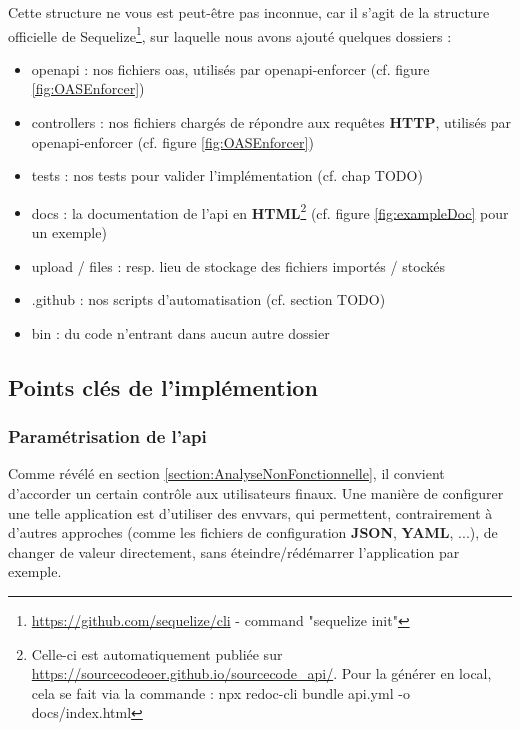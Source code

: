 Cette structure ne vous est peut-être pas inconnue, car il s'agit de la structure officielle de Sequelize\footnote{
    \url{https://github.com/sequelize/cli} - command "sequelize init"
}, sur laquelle nous avons ajouté quelques dossiers :

\begin{itemize}
    \item openapi : nos fichiers \Gls{oas}, utilisés par openapi-enforcer (cf. figure \ref{fig:OASEnforcer})
    \item controllers : nos fichiers chargés de répondre aux requêtes \textbf{HTTP}, utilisés par openapi-enforcer (cf. figure \ref{fig:OASEnforcer})
    \item tests : nos tests pour valider l'implémentation (cf. chap TODO)
    \item docs : la documentation de l'\Gls{api} en \textbf{HTML}\footnote{
        Celle-ci est automatiquement publiée sur 
        \href{https://sourcecodeoer.github.io/sourcecode\_api/}{https://sourcecodeoer.github.io/sourcecode\_api/}.
        Pour la générer en local, cela se fait via la commande : 
        npx redoc-cli bundle api.yml -o docs/index.html 
    } (cf. figure \ref{fig:exampleDoc} pour un exemple)
    \item upload / files : resp. lieu de stockage des fichiers importés / stockés 
    \item .github : nos scripts d'automatisation (cf. section TODO) 
    \item bin : du code n'entrant dans aucun autre dossier
\end{itemize}

\pagebreak
\subsection{Points clés de l'implémention}

\subsubsection{Paramétrisation de l'\Gls{api}}

Comme révélé en section \ref{section:AnalyseNonFonctionnelle}, il convient d'accorder un certain contrôle aux utilisateurs finaux.
Une manière de configurer une telle application est d'utiliser des \glspl{envvar}, 
qui permettent, contrairement à d'autres approches (comme les fichiers de configuration \textbf{JSON}, \textbf{YAML}, ...), 
de changer de valeur directement, sans éteindre/rédémarrer l'application par exemple. \\

